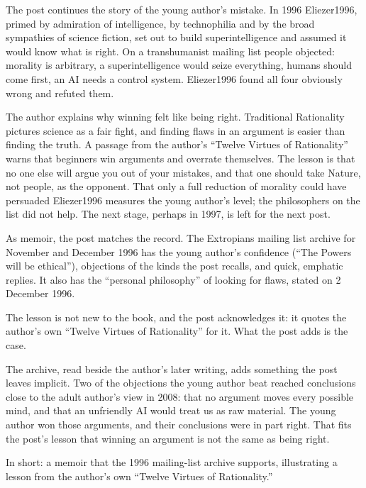 \begin{afterword}
\summaryhead

The post continues the story of the young author's mistake. In 1996 Eliezer1996, primed by admiration of intelligence, by technophilia and by the broad sympathies of science fiction, set out to build superintelligence and assumed it would know what is right. On a transhumanist mailing list people objected: morality is arbitrary, a superintelligence would seize everything, humans should come first, an AI needs a control system. Eliezer1996 found all four obviously wrong and refuted them.

The author explains why winning felt like being right. Traditional Rationality pictures science as a fair fight, and finding flaws in an argument is easier than finding the truth. A passage from the author's ``Twelve Virtues of Rationality'' warns that beginners win arguments and overrate themselves. The lesson is that no one else will argue you out of your mistakes, and that one should take Nature, not people, as the opponent. That only a full reduction of morality could have persuaded Eliezer1996 measures the young author's level; the philosophers on the list did not help. The next stage, perhaps in 1997, is left for the next post.

\responsehead

As memoir, the post matches the record. The Extropians mailing list archive for November and December 1996 has the young author's confidence (``The Powers will be ethical''), objections of the kinds the post recalls, and quick, emphatic replies. It also has the ``personal philosophy'' of looking for flaws, stated on 2 December 1996.

The lesson is not new to the book, and the post acknowledges it: it quotes the author's own ``Twelve Virtues of Rationality'' for it. What the post adds is the case.

The archive, read beside the author's later writing, adds something the post leaves implicit. Two of the objections the young author beat reached conclusions close to the adult author's view in 2008: that no argument moves every possible mind, and that an unfriendly AI would treat us as raw material. The young author won those arguments, and their conclusions were in part right. That fits the post's lesson that winning an argument is not the same as being right.

In short: a memoir that the 1996 mailing-list archive supports, illustrating a lesson from the author's own ``Twelve Virtues of Rationality.''
\end{afterword}
